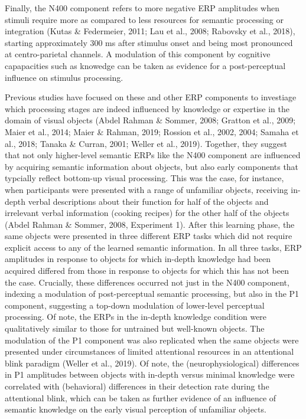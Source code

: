 \documentclass[
  english,
  man,11pt,floatsintext]{apa7}
\begin{document}
Finally, the N400 component refers to more negative ERP amplitudes when stimuli require more as compared to less resources for semantic processing or integration (Kutas \& Federmeier, 2011; Lau et al., 2008; Rabovsky et al., 2018), starting approximately 300 ms after stimulus onset and being most pronounced at centro-parietal channels. A modulation of this component by cognitive capapacities such as knowedge can be taken as evidence for a post-perceptual influence on stimulus processing.

Previous studies have focused on these and other ERP components to investiage which processing stages are indeed influenced by knowledge or expertise in the domain of visual objects (Abdel Rahman \& Sommer, 2008; Gratton et al., 2009; Maier et al., 2014; Maier \& Rahman, 2019; Rossion et al., 2002, 2004; Samaha et al., 2018; Tanaka \& Curran, 2001; Weller et al., 2019). Together, they suggest that not only higher-level semantic ERPs like the N400 component are influenced by acquiring semantic information about objects, but also early components that typcially reflect bottom-up visual processing. This was the case, for instance, when participants were presented with a range of unfamiliar objects, receiving in-depth verbal descriptions about their function for half of the objects and irrelevant verbal information (cooking recipes) for the other half of the objects (Abdel Rahman \& Sommer, 2008, Experiment 1). After this learning phase, the same objects were presented in three different ERP tasks which did not require explicit access to any of the learned semantic information. In all three tasks, ERP amplitudes in response to objects for which in-depth knowledge had been acquired differed from those in response to objects for which this has not been the case. Crucially, these differences occurred not just in the N400 component, indexing a modulation of post-perceptual semantic processing, but also in the P1 component, suggesting a top-down modulation of lower-level perceptual processing. Of note, the ERPs in the in-depth knowledge condition were qualitatively similar to those for untrained but well-known objects. The modulation of the P1 component was also replicated when the same objects were presented under circumstances of limited attentional resources in an attentional blink paradigm (Weller et al., 2019). Of note, the (neurophysiological) differences in P1 amplitudes between objects with in-depth versus minimal knowledge were correlated with (behavioral) differences in their detection rate during the attentional blink, which can be taken as further evidence of an influence of semantic knowledge on the early visual perception of unfamiliar objects.
\end{document}
